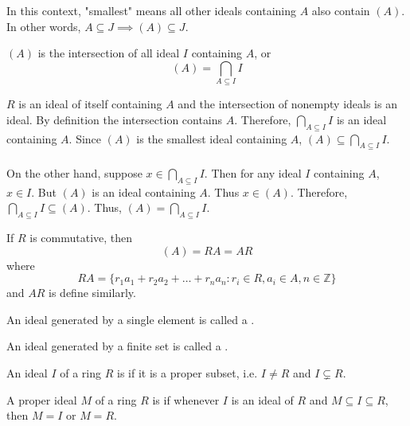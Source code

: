 \documentclass{mathnotes}
\begin{document}
\begin{note}
  In this context, "smallest" means all other ideals containing $A$ also
  contain $(A)$. In other words, $A\subseteq J\implies(A)\subseteq J$.
\end{note}

\begin{prop}
  $(A)$ is the intersection of all ideal $I$ containing $A$, or
  $$(A)=\bigcap_{A\subseteq I}I$$
\end{prop}

\begin{pf}
  $R$ is an ideal of itself containing $A$ and the intersection of nonempty
  ideals is an ideal. By definition the intersection contains $A$. Therefore,
  $\bigcap_{A\subseteq I}I$ is an ideal containing $A$. Since $(A)$ is the
  smallest ideal containing $A$, $(A)\subseteq\bigcap_{A\subseteq I}I$.\\\\
  On the other hand, suppose $x\in\bigcap_{A\subseteq I}I$. Then for any ideal
  $I$ containing $A$, $x\in I$. But $(A)$ is an ideal containing $A$. Thus
  $x\in(A)$. Therefore, $\bigcap_{A\subseteq I}I\subseteq(A)$. Thus,
  $(A)=\bigcap_{A\subseteq I} I$.
\end{pf}

\begin{prop}
  If $R$ is commutative, then
  $$(A)=RA=AR$$
  where
  $$RA=\{r_1a_1+r_2a_2+\ldots+r_na_n:r_i\in R, a_i\in A, n\in\mathbb{Z}\}$$
  and $AR$ is define similarly.
\end{prop}

\begin{defi}
  An ideal generated by a single element is called a .
\end{defi}

\begin{defi}
  An ideal generated by a finite set is called a .
\end{defi}

\begin{defi}
  An ideal $I$ of a ring $R$ is  if it is a proper subset, i.e.
  $I\ne R$ and $I\subsetneq R$.
\end{defi}

\begin{defi}
  A proper ideal $M$ of a ring $R$ is  if whenever $I$ is an
  ideal of $R$ and $M\subseteq I\subseteq R$, then $M=I$ or $M=R$.
\end{defi}
\end{document}
